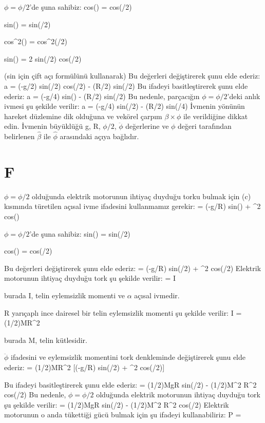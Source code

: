 \documentclass[12pt]{article}
\begin{document}
$\phi = \phi/2$'de şuna sahibiz:
\bigbreak
cos(\phi) = cos(\phi/2)

sin(\phi) = sin(\phi/2)

cos^2(\phi) = cos^2(\phi/2)

sin(\phi) = 2 sin(\phi/2) cos(\phi/2) 

(sin için çift açı formülünü kullanarak)
\bigbreak
Bu değerleri değiştirerek şunu elde ederiz:
\bigbreak
a = (-g/2) sin(\phi/2) cos(\phi/2) \beta\times\phi - (R/2) \ddot\phi sin(\phi/2) \phi
\bigbreak
Bu ifadeyi basitleştirerek şunu elde ederiz:
\bigbreak
a = (-g/4) sin(\phi) \beta\times\phi - (R/2) \ddot\phi sin(\phi/2) \phi
\bigbreak
Bu nedenle, parçacığın $\phi = \phi/2$'deki anlık ivmesi şu şekilde verilir:
\bigbreak
a = (-g/4) sin(\phi/2) \beta\times\phi - (R/2) \ddot\phi sin(\phi/4) \phi
\bigbreak
İvmenin yönünün hareket düzlemine dik olduğuna ve vekörel çarpım $\beta\times\phi$ ile verildiğine dikkat edin. İvmenin büyüklüğü g, R, $\phi/2$, $\ddot\phi$ değerlerine ve $\phi$ değeri tarafından belirlenen $\hat\beta$ ile $\hat\phi$ arasındaki açıya bağlıdır.
\newpage
\section{F}
$\phi = \phi/2$ olduğunda elektrik motorunun ihtiyaç duyduğu torku bulmak için (c) kısmında türetilen açısal ivme ifadesini kullanmamız gerekir:
\bigbreak
\ddot\phi = (-g/R) sin(\phi) + \Omega^2 cos(\phi)

$\phi = \phi/2$'de şuna sahibiz:
\bigbreak
sin(\phi) = sin(\phi/2)

cos(\phi) = cos(\phi/2)

Bu değerleri değiştirerek şunu elde ederiz:
\bigbreak
\ddot\phi = (-g/R) sin(\phi/2) + \Omega^2 cos(\phi/2)
\bigbreak
Elektrik motorunun ihtiyaç duyduğu tork şu şekilde verilir:
\bigbreak
\tau = I\alpha

burada I, telin eylemsizlik momenti ve $\alpha$ açısal ivmedir.

R yarıçaplı ince dairesel bir telin eylemsizlik momenti şu şekilde verilir:
\bigbreak
I = (1/2)MR^2

burada M, telin kütlesidir.

$\ddot\phi$ ifadesini ve eylemsizlik momentini tork denkleminde değiştirerek şunu elde ederiz:
\bigbreak
\tau = (1/2)MR^2 [(-g/R) sin(\phi/2) + \Omega^2 cos(\phi/2)]

Bu ifadeyi basitleştirerek şunu elde ederiz:
\bigbreak
\tau = (1/2)MgR sin(\phi/2) - (1/2)M\Omega^2 R^2 cos(\phi/2)
\bigbreak
Bu nedenle, $\phi = \phi/2$ olduğunda elektrik motorunun ihtiyaç duyduğu tork şu şekilde verilir:
\bigbreak
\tau = (1/2)MgR sin(\phi/2) - (1/2)M\Omega^2 R^2 cos(\phi/2)
\newpage
Elektrik motorunun o anda tükettiği gücü bulmak için şu ifadeyi kullanabiliriz:
\bigbreak
P = \tau\Omega
\end{document}

